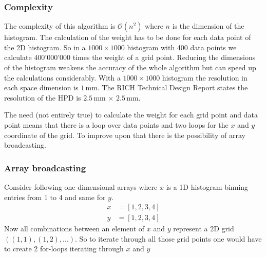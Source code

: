 \documentclass[11pt,twoside]{scrreprt}
\begin{document}
\subsubsection{Complexity} %
\label{ssub:complexity_2d}
The complexity of this algorithm is $\mathcal{O}(n^2)$ where $n$ is the dimension of the histogram. The calculation of the weight has to be done for each data point of the 2D histogram. So in a $1000\times 1000$ histogram with 400 data points we calculate 400'000'000 times the weight of a grid point. Reducing the dimensions of the histogram weakens the accuracy of the whole algorithm but can speed up the calculations considerably. With a $1000\times 1000$ histogram the resolution in each space dimension is $1$\,mm. The RICH Technical Design Report states the resolution of the HPD is $2.5$\,mm $\times$ $2.5$\,mm.

The need (not entirely true) to calculate the weight for each grid point and data point means that there is a loop over data points and two loops for the $x$ and $y$ coordinate of the grid. To improve upon that there is the possibility of array broadcasting.

\subsubsection{Array broadcasting}
Consider following one dimensional arrays where $x$ is a 1D histogram binning entries from 1 to 4 and same for $y$. 
\begin{align*}
  x &= [1, 2, 3, 4]\\
  y &= [1, 2, 3, 4]  
\end{align*}
Now all combinations between an element of $x$ and $y$ represent a 2D grid $\left((1,1), (1,2), ...\right)$. So to iterate through all those grid points one would have to create 2 for-loops iterating through $x$ and $y$
\end{document}
